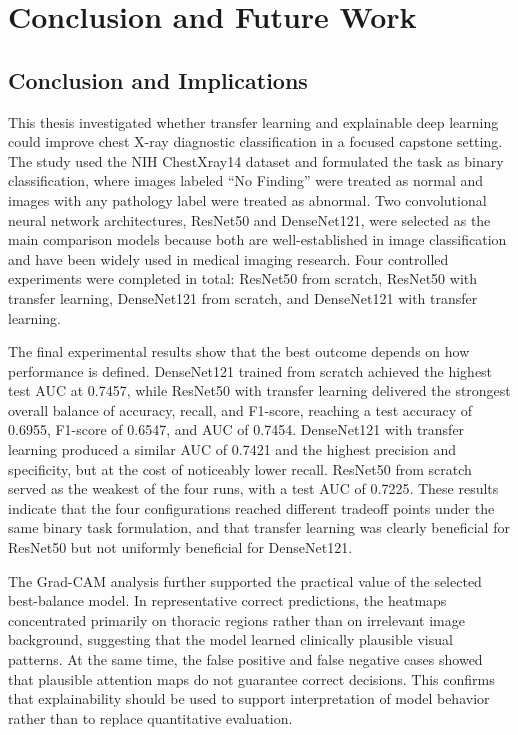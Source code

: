 \chapter{Conclusion and Future Work}

\section{Conclusion and Implications}
This thesis investigated whether transfer learning and explainable deep learning could improve chest X-ray diagnostic classification in a focused capstone setting. The study used the NIH ChestXray14 dataset and formulated the task as binary classification, where images labeled ``No Finding'' were treated as normal and images with any pathology label were treated as abnormal. Two convolutional neural network architectures, ResNet50 and DenseNet121, were selected as the main comparison models because both are well-established in image classification and have been widely used in medical imaging research. Four controlled experiments were completed in total: ResNet50 from scratch, ResNet50 with transfer learning, DenseNet121 from scratch, and DenseNet121 with transfer learning.

The final experimental results show that the best outcome depends on how performance is defined. DenseNet121 trained from scratch achieved the highest test AUC at 0.7457, while ResNet50 with transfer learning delivered the strongest overall balance of accuracy, recall, and F1-score, reaching a test accuracy of 0.6955, F1-score of 0.6547, and AUC of 0.7454. DenseNet121 with transfer learning produced a similar AUC of 0.7421 and the highest precision and specificity, but at the cost of noticeably lower recall. ResNet50 from scratch served as the weakest of the four runs, with a test AUC of 0.7225. These results indicate that the four configurations reached different tradeoff points under the same binary task formulation, and that transfer learning was clearly beneficial for ResNet50 but not uniformly beneficial for DenseNet121.

The Grad-CAM analysis further supported the practical value of the selected best-balance model. In representative correct predictions, the heatmaps concentrated primarily on thoracic regions rather than on irrelevant image background, suggesting that the model learned clinically plausible visual patterns. At the same time, the false positive and false negative cases showed that plausible attention maps do not guarantee correct decisions. This confirms that explainability should be used to support interpretation of model behavior rather than to replace quantitative evaluation.

